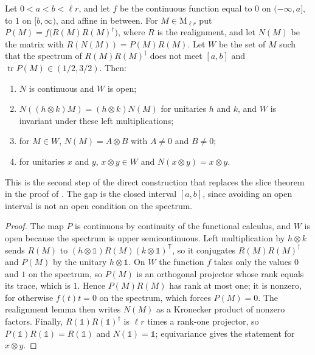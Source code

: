 \begin{lemma}
    \label{lem:nearest_kronecker_product}
    \leanok
    Let $0<a<b<\ell r$, and let $f$ be the continuous function equal to $0$ on
    $(-\infty,a]$, to $1$ on $[b,\infty)$, and affine in between. For
    $M\in\mathrm M_{\ell r}$ put $P(M)=f\bigl(R(M)R(M)^\dagger\bigr)$, where
    $R$ is the realignment, and let $N(M)$ be the matrix with
    $R(N(M))=P(M)R(M)$. Let $W$ be the set of $M$ such that the spectrum of
    $R(M)R(M)^\dagger$ does not meet $[a,b]$ and
    $\operatorname{tr}P(M)\in(1/2,3/2)$. Then:
    \begin{enumerate}
        \item $N$ is continuous and $W$ is open;
        \item $N((h\otimes k)M)=(h\otimes k)N(M)$ for unitaries $h$ and $k$,
              and $W$ is invariant under these left multiplications;
        \item for $M\in W$, $N(M)=A\otimes B$ with $A\neq0$ and $B\neq0$;
        \item for unitaries $x$ and $y$, $x\otimes y\in W$ and
              $N(x\otimes y)=x\otimes y$.
    \end{enumerate}
    This is the second step of the direct construction that replaces the
    slice theorem in the proof of \cite[Corollary~IV.7]{Cirac2017MPU}. The gap
    is the closed interval $[a,b]$, since avoiding an open interval is not an
    open condition on the spectrum.
\end{lemma}

\begin{proof}\leanok
    The map $P$ is continuous by continuity of the functional calculus, and
    $W$ is open because the spectrum is upper semicontinuous. Left
    multiplication by $h\otimes k$ sends $R(M)$ to
    $(h\otimes\mathbb 1)R(M)(k\otimes\mathbb 1)^{\mathsf T}$, so it conjugates
    $R(M)R(M)^\dagger$ and $P(M)$ by the unitary $h\otimes\mathbb 1$. On $W$ the
    function $f$ takes only the values $0$ and $1$ on the spectrum, so $P(M)$ is
    an orthogonal projector whose rank equals its trace, which is $1$. Hence
    $P(M)R(M)$ has rank at most one; it is nonzero, for otherwise
    $f(t)t=0$ on the spectrum, which forces $P(M)=0$. The realignment lemma
    then writes $N(M)$ as a Kronecker product of nonzero factors. Finally,
    $R(\mathbb 1)R(\mathbb 1)^\dagger$ is $\ell r$ times a rank-one projector,
    so $P(\mathbb 1)R(\mathbb 1)=R(\mathbb 1)$ and
    $N(\mathbb 1)=\mathbb 1$; equivariance gives the statement for
    $x\otimes y$.
\end{proof}

